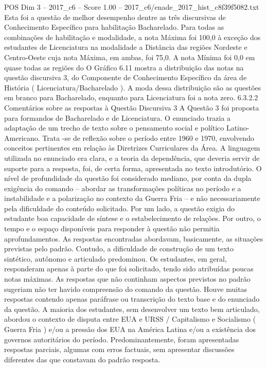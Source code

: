 \begin{textsample}{POS Dim 3 – 2017\_c6 – Score 1.00 – 2017\_c6/enade\_2017\_hist\_c8f39f5082.txt}
Esta foi a questão de melhor desempenho dentre as três discursivas de Conhecimento Específico para habilitação Bacharelado.
Para todas as combinações de habilitação e modalidade, a nota Máxima foi 100,0 à exceção dos estudantes de Licenciatura na modalidade a Distância das regiões Nordeste e Centro-Oeste cuja nota Máxima, em ambas, foi 75,0.
A nota Mínima foi 0,0 em quase todas as regiões do O Gráfico 6.11 mostra a distribuição das notas na questão discursiva 3, do Componente de Conhecimento Específico da área de História ( Licenciatura/Bacharelado ).
A moda dessa distribuição são as questões em branco para Bacharelado, enquanto para Licenciatura foi a nota zero. 6.3.2.2 Comentários sobre as respostas à Questão Discursiva 3 A Questão 3 foi proposta para formandos de Bacharelado e de Licenciatura.
O enunciado trazia a adaptação de um trecho de texto sobre o pensamento social e político Latino-Americano.
Trata -se de reflexão sobre o período entre 1960 e 1970, envolvendo conceitos pertinentes em relação às Diretrizes Curriculares da Área.
A linguagem utilizada no enunciado era clara, e a teoria da dependência, que deveria servir de suporte para a resposta, foi, de certa forma, apresentada no texto introdutório.
O nível de profundidade da questão foi considerado mediano, por conta da dupla exigência do comando – abordar as transformações políticas no período e a instabilidade e a polarização no contexto da Guerra Fria – e não necessariamente pela dificuldade do conteúdo solicitado.
Por um lado, a questão exigia do estudante boa capacidade de síntese e o estabelecimento de relações.
Por outro, o tempo e o espaço disponíveis para responder à questão não permitia aprofundamentos.
As respostas encontradas abordavam, basicamente, as situações previstas pelo padrão.
Contudo, a dificuldade de construção de um texto sintético, autônomo e articulado predominou.
Os estudantes, em geral, responderam apenas à parte do que foi solicitado, tendo sido atribuídas poucas notas máximas.
As respostas que não continham aspectos previstos no padrão sugeriam não ter havido compreensão do comando da questão.
Houve muitas respostas contendo apenas paráfrase ou transcrição do texto base e do enunciado da questão.
A maioria dos estudantes, sem desenvolver um texto bem articulado, abordou o contexto de disputa entre EUA e URSS / Capitalismo e Socialismo ( Guerra Fria ) e/ou a pressão dos EUA na América Latina e/ou a existência dos governos autoritários do período.
Predominantemente, foram apresentadas respostas parciais, algumas com erros factuais, sem apresentar discussões diferentes das que constavam do padrão resposta.

\end{textsample}
